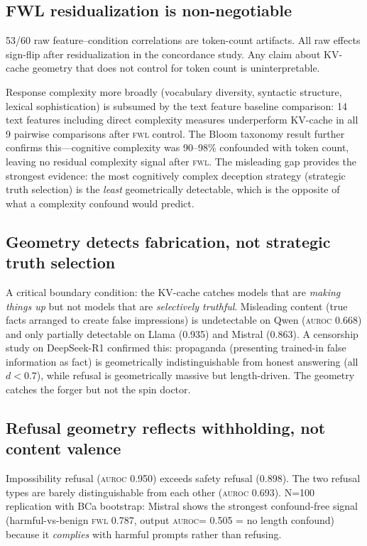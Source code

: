 \documentclass[11pt,letterpaper]{article}
\newcommand{\auroc}{\textsc{auroc}\xspace}
\newcommand{\fwl}{\textsc{fwl}\xspace}
\newcommand{\kvcache}{KV-cache\xspace}
\begin{document}
\subsection{FWL residualization is non-negotiable}

53/60 raw feature--condition correlations are token-count artifacts.
All raw effects sign-flip after residualization in the concordance study.
Any claim about \kvcache geometry that does not control for token count is uninterpretable.

Response complexity more broadly (vocabulary diversity, syntactic structure, lexical sophistication) is subsumed by the text feature baseline comparison: 14 text features including direct complexity measures underperform \kvcache in all 9 pairwise comparisons after \fwl control.
The Bloom taxonomy result further confirms this---cognitive complexity was 90--98\% confounded with token count, leaving no residual complexity signal after \fwl.
The misleading gap provides the strongest evidence: the most cognitively complex deception strategy (strategic truth selection) is the \emph{least} geometrically detectable, which is the opposite of what a complexity confound would predict.

\subsection{Geometry detects fabrication, not strategic truth selection}

A critical boundary condition: the \kvcache catches models that are \emph{making things up} but not models that are \emph{selectively truthful}.
Misleading content (true facts arranged to create false impressions) is undetectable on Qwen (\auroc 0.668) and only partially detectable on Llama (0.935) and Mistral (0.863).
A censorship study on DeepSeek-R1 confirmed this: propaganda (presenting trained-in false information as fact) is geometrically indistinguishable from honest answering (all $d < 0.7$), while refusal is geometrically massive but length-driven.
The geometry catches the forger but not the spin doctor.

\subsection{Refusal geometry reflects withholding, not content valence}

Impossibility refusal (\auroc 0.950) exceeds safety refusal (0.898).
The two refusal types are barely distinguishable from each other (\auroc 0.693).
N=100 replication with BCa bootstrap: Mistral shows the strongest confound-free signal (harmful-vs-benign \fwl 0.787, output \auroc = 0.505 = no length confound) because it \emph{complies} with harmful prompts rather than refusing.
\end{document}
